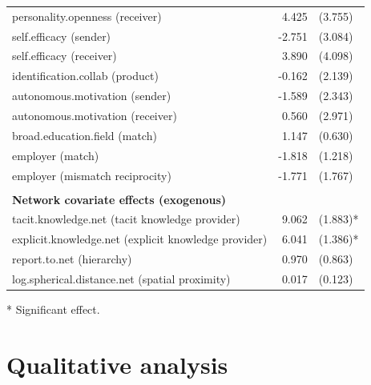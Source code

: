 \begin{table}[]
\begin{threeparttable}
\begin{tabular}{@{}lrl@{}}
			personality.openness (receiver)                      & 4.425          & (3.755)          \\
			self.efficacy (sender)                               & -2.751         & (3.084)          \\
			self.efficacy (receiver)                             & 3.890          & (4.098)          \\
			identification.collab (product)                      & -0.162         & (2.139)          \\
			autonomous.motivation (sender)                       & -1.589         & (2.343)          \\
			autonomous.motivation (receiver)                     & 0.560          & (2.971)          \\
			broad.education.field (match)                        & 1.147          & (0.630)          \\
			employer (match)                                     & -1.818         & (1.218)          \\
			employer (mismatch reciprocity)                      & -1.771         & (1.767)          \\
			&                &                  \\
			\textbf{Network covariate effects (exogenous)}       &                &                  \\
			tacit.knowledge.net (tacit knowledge provider)       & 9.062          & (1.883)*         \\
			explicit.knowledge.net (explicit knowledge provider) & 6.041          & (1.386)*         \\
			report.to.net (hierarchy)                            & 0.970          & (0.863)          \\
			log.spherical.distance.net (spatial proximity)       & 0.017          & (0.123)          \\ \bottomrule
		\end{tabular}
		\begin{tablenotes}
			\small
			\item [*] Significant effect.
			\
		\end{tablenotes}
	\end{threeparttable}
\end{table}


\section{Qualitative analysis}

